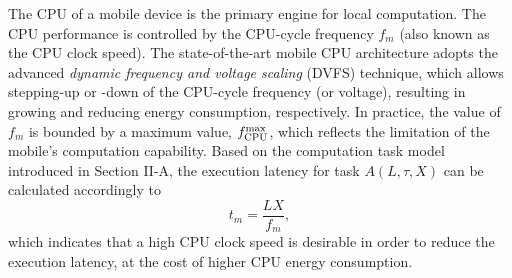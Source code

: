 \documentclass[journal]{IEEEtran}
\begin{document}
The CPU of a mobile device  is the primary  engine  for local computation.  The CPU performance is controlled  by the CPU-cycle frequency $f_{m}$ (also known as the CPU clock speed).  The state-of-the-art mobile CPU architecture adopts the advanced \emph{dynamic frequency and voltage scaling} (DVFS) technique, which allows stepping-up or -down of the CPU-cycle frequency (or voltage), resulting in growing and reducing energy  consumption, respectively. In practice, the value of $f_{m}$ is bounded by a maximum value, $f_{\rm{CPU}}^{\max}$, which reflects the limitation of the mobile's  computation capability. Based on the computation task model introduced in Section II-A, the execution latency for task $A\left(L,\tau,X\right)$ can be calculated accordingly to
\begin{equation}
t_{m} = \frac{LX}{f_{m}},
\label{SecII:CPUlatency}
\end{equation}
which indicates that a high CPU clock speed is desirable in order to reduce the execution latency, at the cost of higher CPU energy consumption.
\end{document}
